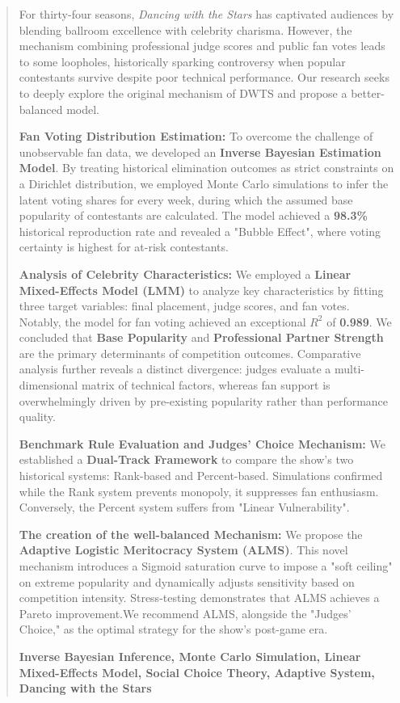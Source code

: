 \begin{abstract}

    For thirty-four seasons, \textit{Dancing with the Stars} has captivated audiences by blending ballroom excellence with celebrity charisma. However, the mechanism combining professional judge scores and public fan votes leads to some loopholes, historically sparking controversy when popular contestants survive despite poor technical performance. Our research seeks to deeply explore the original mechanism of DWTS and propose a better-balanced model.

    \textbf{Fan Voting Distribution Estimation:} To overcome the challenge of unobservable fan data, we developed an \textbf{Inverse Bayesian Estimation Model}. By treating historical elimination outcomes as strict constraints on a Dirichlet distribution, we employed Monte Carlo simulations to infer the latent voting shares for every week, during which the assumed base popularity of contestants are calculated. The model achieved a \textbf{98.3\%} historical reproduction rate and revealed a "Bubble Effect", where voting certainty is highest for at-risk contestants.

    \textbf{Analysis of Celebrity Characteristics:} We employed a \textbf{Linear Mixed-Effects Model (LMM)} to analyze key characteristics by fitting three target variables: final placement, judge scores, and fan votes. Notably, the model for fan voting achieved an exceptional $R^2$ of \textbf{0.989}. We concluded that \textbf{Base Popularity} and \textbf{Professional Partner Strength} are the primary determinants of competition outcomes. Comparative analysis further reveals a distinct divergence: judges evaluate a multi-dimensional matrix of technical factors, whereas fan support is overwhelmingly driven by pre-existing popularity rather than performance quality.

    \textbf{Benchmark Rule Evaluation and Judges' Choice Mechanism:} We established a \textbf{Dual-Track Framework} to compare the show's two historical systems: Rank-based and Percent-based. Simulations confirmed while the Rank system prevents monopoly, it suppresses fan enthusiasm. Conversely, the Percent system suffers from "Linear Vulnerability".

    \textbf{The creation of the well-balanced Mechanism:} We propose the \textbf{Adaptive Logistic Meritocracy System (ALMS)}. This novel mechanism introduces a Sigmoid saturation curve to impose a "soft ceiling" on extreme popularity and dynamically adjusts sensitivity based on competition intensity. Stress-testing demonstrates that ALMS achieves a Pareto improvement.We recommend ALMS, alongside the "Judges' Choice," as the optimal strategy for the show's post-game era.

    \begin{keywords}
        \textbf{Inverse Bayesian Inference, Monte Carlo Simulation, Linear Mixed-Effects Model, Social Choice Theory, Adaptive System, Dancing with the Stars}
    \end{keywords}

\end{abstract}